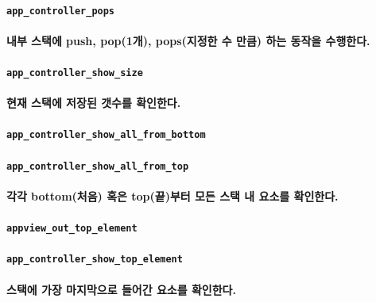 \documentclass[UTF8]{report}
\begin{document}
            \paragraph{\texttt{app\_controller\_pops}}
            \paragraph{%
                \normalfont 내부 스택에 push, pop(1개), pops(지정한 수 만큼) 하는 동작을 수행한다.
            }

            \paragraph{\texttt{app\_controller\_show\_size}}
            \paragraph{%
                \normalfont 현재 스택에 저장된 갯수를 확인한다.
            }

            \paragraph{\texttt{app\_controller\_show\_all\_from\_bottom}}
            \paragraph{\texttt{app\_controller\_show\_all\_from\_top}}
            \paragraph{%
                \normalfont 각각 bottom(처음) 혹은 top(끝)부터 모든 스택 내 요소를 확인한다.
            }

            \paragraph{\texttt{appview\_out\_top\_element}}
            \paragraph{\texttt{app\_controller\_show\_top\_element}}
            \paragraph{%
                \normalfont 스택에 가장 마지막으로 들어간 요소를 확인한다.
            }
\end{document}
